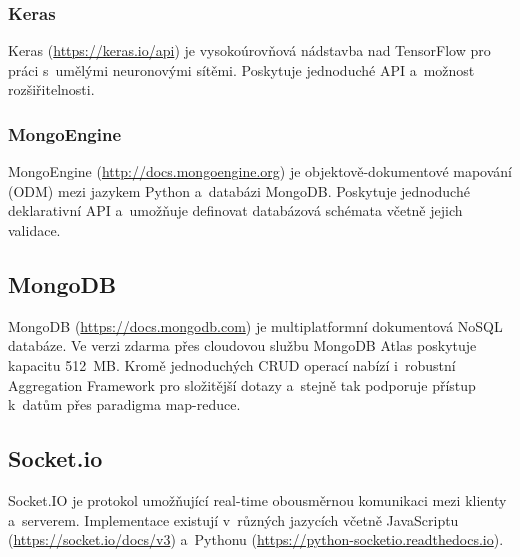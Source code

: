 \documentclass[a4paper,12pt]{article}
\begin{document}
{{{{{{{{

\subsubsection{Keras}

Keras (\url{https://keras.io/api}) je vysokoúrovňová nádstavba nad TensorFlow pro práci s~umělými neuronovými sítěmi. Poskytuje jednoduché API a~možnost rozšiřitelnosti.~\cite{keras}



\subsubsection{MongoEngine}

MongoEngine (\url{http://docs.mongoengine.org}) je objektově-dokumentové mapování (ODM) mezi jazykem Python a~databázi MongoDB. Poskytuje jednoduché deklarativní API a~umožňuje definovat databázová schémata včetně jejich validace.~\cite{mongoengine}
\clearpage



\vspace{-10pt}

\subsection{MongoDB}

MongoDB (\url{https://docs.mongodb.com}) je multiplatformní dokumentová NoSQL databáze. Ve verzi zdarma přes cloudovou službu MongoDB Atlas poskytuje kapacitu 512~MB. Kromě jednoduchých CRUD operací nabízí i~robustní Aggregation Framework pro složitější dotazy a~stejně tak podporuje přístup k~datům přes paradigma map-reduce.~\cite{mongodb,mongodbbook}



\vspace{-10pt}

\subsection{Socket.io}

Socket.IO je protokol umožňující real-time obousměrnou komunikaci mezi klienty a~serverem. Implementace existují v~různých jazycích včetně JavaScriptu (\url{https://socket.io/docs/v3}) a~Pythonu (\url{https://python-socketio.readthedocs.io}).~\cite{socketio}

}}}}}}}}
\end{document}
